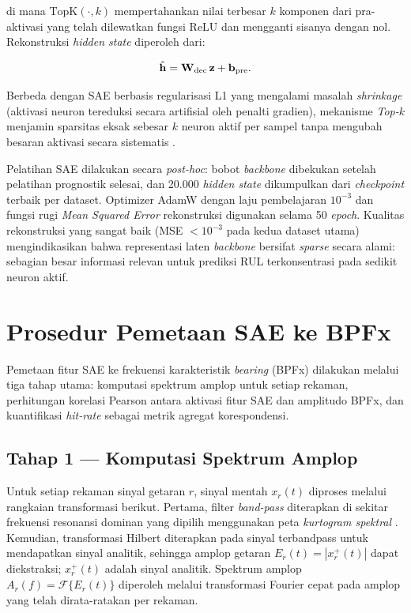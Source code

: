 \noindent di mana $\mathrm{TopK}(\cdot, k)$ mempertahankan nilai terbesar
$k$ komponen {\color{blue}dari pra-aktivasi yang telah dilewatkan
fungsi $\mathrm{ReLU}$} dan mengganti sisanya dengan nol.
Rekonstruksi \emph{hidden state} diperoleh dari:

\begin{equation}\label{eq:bab5_sae_recon}
  \hat{\mathbf{h}} = \mathbf{W}_{\rm dec}\, \mathbf{z} + \mathbf{b}_{\rm pre}.
\end{equation}

Berbeda dengan SAE berbasis regularisasi L1 yang mengalami masalah
\emph{shrinkage} (aktivasi neuron tereduksi secara artifisial oleh penalti
gradien), mekanisme \emph{Top-$k$} menjamin sparsitas eksak sebesar $k$
neuron aktif per sampel tanpa mengubah besaran aktivasi secara sistematis
.

Pelatihan SAE dilakukan secara \emph{post-hoc}: bobot \emph{backbone}
dibekukan setelah pelatihan prognostik selesai, dan 20.000 \emph{hidden
state} dikumpulkan dari \emph{checkpoint} terbaik per dataset.
Optimizer AdamW dengan laju pembelajaran $10^{-3}$ dan fungsi rugi
\emph{Mean Squared Error} rekonstruksi digunakan selama 50 \emph{epoch}.
Kualitas rekonstruksi yang sangat baik (MSE $< 10^{-3}$ pada kedua dataset
utama) mengindikasikan bahwa representasi laten \emph{backbone} bersifat
\emph{sparse} secara alami: sebagian besar informasi relevan untuk
prediksi RUL terkonsentrasi pada sedikit neuron aktif.

\section{Prosedur Pemetaan SAE ke BPFx}
\label{sec:bab5_pemetaan_bpfx}

Pemetaan fitur SAE ke frekuensi karakteristik \emph{bearing} (BPFx) dilakukan
melalui tiga tahap utama: komputasi spektrum amplop untuk setiap rekaman,
perhitungan korelasi Pearson antara aktivasi fitur SAE dan amplitudo BPFx,
dan kuantifikasi \emph{hit-rate} sebagai metrik agregat korespondensi.

\subsection*{Tahap 1 --- Komputasi Spektrum Amplop}

Untuk setiap rekaman sinyal getaran $r$, sinyal mentah $x_r(t)$ diproses
melalui rangkaian transformasi berikut.
Pertama, filter \emph{band-pass} diterapkan di sekitar frekuensi resonansi
dominan yang dipilih menggunakan peta \emph{kurtogram spektral}
.
Kemudian, transformasi Hilbert diterapkan pada sinyal terbandpass untuk
mendapatkan sinyal analitik, sehingga amplop getaran
$E_r(t) = |x_r^+(t)|$ dapat diekstraksi; $x_r^+(t)$ adalah sinyal analitik.
Spektrum amplop $A_r(f) = \mathcal{F}\{E_r(t)\}$ diperoleh melalui transformasi
Fourier cepat pada amplop yang telah dirata-ratakan per rekaman.

